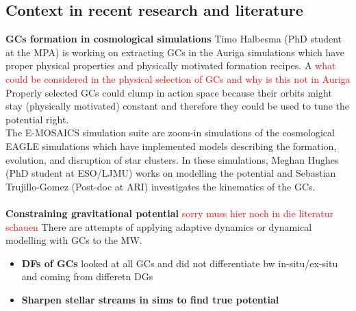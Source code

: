 \subsection{Context in recent research and literature}
\textbf{\acp{GC} formation in cosmological simulations} Timo Halbesma (PhD student at the MPA) is working on extracting \acp{GC} in the Auriga simulations which have proper physical properties and physically motivated formation recipes. A \textcolor{red}{what could be considered in the physical selection of GCs and why is this not in Auriga} Properly selected \acp{GC} could clump in action space because their orbits might stay (physically motivated) constant and therefore they could be used to tune the potential right. \\
The E-MOSAICS simulation suite \citep{Pfeffer...E-MOSAICS...2018, Kruijssen...E-MOSAICS.MW..2018} are zoom-in simulations of the cosmological EAGLE \citep{Schaye...EAGLE...2015} simulations which have implemented models describing the formation, evolution, and disruption of star clusters. In these simulations, Meghan Hughes (PhD student at ESO/LJMU) works on modelling the potential and Sebastian Trujillo-Gomez (Post-doc at ARI) investigates the kinematics of the \acp{GC}. 
\\\\
\textbf{Constraining gravitational potential}
\textcolor{red}{sorry muss hier noch in die literatur schauen}
There are attempts of applying adaptive dynamics or dynamical modelling with \acp{GC} to the \ac{MW}.
\begin{itemize}
    \item \textbf{\acp{DF} of \acp{GC}} \citep{Posti...MWmassGCs...2018}
    looked at all GCs and did not differentiate bw in-situ/ex-situ and coming from differetn \acp{DG}
    \item \textbf{Sharpen stellar streams in sims to find true potential} \citep{Sanderson...streams..adaptivedyn...2015, Sanderson...gravpotstreams...2017}
\end{itemize}
\citet{Jean-Baptiste...accactionspace...2017}

